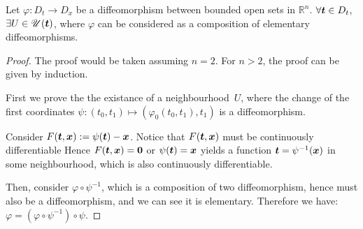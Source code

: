 \documentclass[openany]{book}
\begin{document}
\begin{lemma}
	Let $\varphi \colon D_t \to D_x$ be a diffeomorphism between bounded open sets in $\mathbb R^n$. 
	$\forall \boldsymbol{t} \in D_t$, $\exists U \in \mathscr U(\boldsymbol{t})$, where $\varphi$ can be considered as a composition of elementary diffeomorphisms.
\end{lemma}
\begin{proof}
	The proof would be taken assuming $n = 2$. For $n > 2$, the proof can be given by induction.

	First we prove the the existance of a neighbourhood~$U$, where the change of the first coordinates $\psi \colon (t_0, t_1) \mapsto (\varphi_0(t_0, t_1), t_1)$ is a diffeomorphism.

	Consider $F(\boldsymbol{t}, \boldsymbol{x}) := \psi(\boldsymbol{t}) - \boldsymbol{x}$. 
	Notice that $F(\boldsymbol{t}, \boldsymbol{x})$ must be continuously differentiable
	Hence $F(\boldsymbol{t}, \boldsymbol{x}) = \boldsymbol{0} $ or $\psi(\boldsymbol{t}) = \boldsymbol{x}$ yields a function $\boldsymbol{t} = \psi^{-1}(\boldsymbol{x})$ in some neighbourhood, which is also continuously differentiable.

	Then, consider $\varphi \circ \psi^{-1}$, which is a composition of two diffeomorphism, hence must also be a diffeomorphism, and we can see it is elementary. 
	Therefore we have: $\varphi = (\varphi \circ \psi^{-1}) \circ \psi$.
\end{proof}
\end{document}
